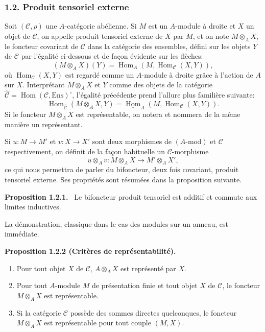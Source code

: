 \documentclass[11pt]{article}
\newenvironment{statement}[1]{\par\medskip\noindent\textbf{#1.}\ }{\par\medskip}
\DeclareMathOperator{\Hom}{Hom}
\providecommand{\uHom}{\underline{\Hom}}
\providecommand{\Hom}{\operatorname{Hom}}
\providecommand{\Ens}{\mathrm{Ens}}
\providecommand{\cC}{\mathcal C}
\providecommand{\Ens}{\operatorname{Ens}}
\providecommand{\cC}{\mathcal C}
\providecommand{\Hom}{\operatorname{Hom}}
\begin{document}
\subsubsection*{1.2. Produit tensoriel externe}
Soit $(\cC,\rho)$ une $A$-catégorie abélienne. Si $M$ est un $A$-module à droite et $X$ un objet de $\cC$, on appelle produit tensoriel externe de $X$ par $M$, et on note $M\otimes_A X$, le foncteur covariant de $\cC$ dans la catégorie des ensembles, défini sur les objets $Y$ de $\cC$ par l'égalité ci-dessous et de façon évidente sur les flèches:
\[
(M\otimes_A X)(Y)=\Hom_A(M,\Hom_{\cC}(X,Y)),
\]
où $\Hom_{\cC}(X,Y)$ est regardé comme un $A$-module à droite grâce à l'action de $A$ sur $X$. Interprétant $M\otimes_AX$ et $Y$ comme des objets de la catégorie $\widehat{\cC}=\Hom(\cC,\Ens)^{\circ}$, l'égalité précédente prend l'allure plus familière suivante:
\[
\Hom_{\widehat{\cC}}(M\otimes_A X,Y)=\uHom_A(M,\Hom_{\cC}(X,Y)).
\]
Si le foncteur $M\otimes_A X$ est représentable, on notera et nommera de la même manière un représentant.

Si $u:M\to M'$ et $v:X\to X'$ sont deux morphismes de $(A\text{-mod})$ et $\cC$ respectivement, on définit de la façon habituelle un $\cC$-morphisme
\[
u\otimes_A v:M\otimes_A X\longrightarrow M'\otimes_A X',
\]
ce qui nous permettra de parler du bifoncteur, deux fois covariant, produit tensoriel externe. Ses propriétés sont résumées dans la proposition suivante.

\begin{statement}{Proposition 1.2.1}
Le bifoncteur produit tensoriel est additif et commute aux limites inductives.
\end{statement}
La démonstration, classique dans le cas des modules sur un anneau, est immédiate.

\begin{statement}{Proposition 1.2.2 (Critères de représentabilité)}
\begin{enumerate}[label=(\alph*)]
\item Pour tout objet $X$ de $\cC$, $A\otimes_AX$ est représenté par $X$.
\item Pour tout $A$-module $M$ de présentation finie et tout objet $X$ de $\cC$, le foncteur $M\otimes_AX$ est représentable.
\item Si la catégorie $\cC$ possède des sommes directes quelconques, le foncteur $M\otimes_A X$ est représentable pour tout couple $(M,X)$.
\end{enumerate}
\end{statement}
\end{document}
